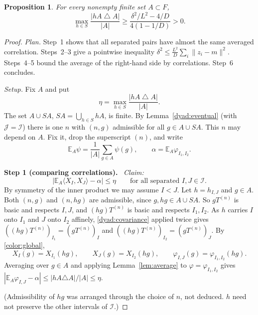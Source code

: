 \documentclass[11pt]{article}
\newcommand{\norm}[1]{\lVert #1\rVert}
\newcommand{\ip}[2]{\langle #1,#2\rangle}
\newcommand{\step}[1]{\par\smallskip\noindent\textbf{Step #1.}\ }
\newtheorem{proposition}[theorem]{Proposition}
\theoremstyle{definition}
\numberwithin{equation}{section}
\begin{document}
\begin{proposition}\label{avg:boundary}
For every nonempty finite set $A\subset F$,
\begin{equation}\label{avg:boundary-bound}
  \max_{h\in S}\frac{|hA\mathbin{\triangle}A|}{|A|}
  \ge\frac{\delta^2/L^2-4/D}{4(1-1/D)}>0.
\end{equation}
\end{proposition}

\begin{proof}
\emph{Plan.} Step~1 shows that all separated pairs have almost the same
averaged correlation. Steps~2--3 give a pointwise inequality
$\delta^2\le\frac{L^2}{D}\sum_i\norm{z_i-m}^2$. Steps~4--5 bound the
average of the right-hand side by correlations. Step~6 concludes.

\emph{Setup.} Fix $A$ and put
\begin{equation}\label{avg:defect}
  \eta=\max_{h\in S}\frac{|hA\mathbin{\triangle}A|}{|A|}.
\end{equation}
The set $A\cup SA$, $SA=\bigcup_{h\in S}hA$, is finite. By
Lemma~\ref{dyad:eventual} (with $\mathcal J=\mathcal I$) there is one $n$
with $(n,g)$ admissible for all $g\in A\cup SA$. This $n$ may depend on $A$.
Fix it, drop the superscript $(n)$, and write
\[
  \mathbb E_A\psi=\frac1{|A|}\sum_{g\in A}\psi(g),\qquad
  \alpha=\mathbb E_A\varphi_{I_1,I_2}.
\]

\step{1 (comparing correlations)} \emph{Claim:}
\begin{equation}\label{avg:correlation}
  \bigl|\mathbb E_A\ip{X_I}{X_J}-\alpha\bigr|\le\eta
  \qquad\text{for all separated $I,J\in\mathcal I$}.
\end{equation}
By symmetry of the inner product we may assume $I<J$. Let $h=h_{I,J}$ and
$g\in A$. Both $(n,g)$ and $(n,hg)$ are admissible, since
$g,hg\in A\cup SA$. So $gT^{(n)}$ is basic and respects $I,J$, and
$(hg)T^{(n)}$ is basic and respects $I_1,I_2$. As $h$ carries $I$ onto $I_1$
and $J$ onto $I_2$ affinely, \eqref{dyad:covariance} applied twice gives
$((hg)T^{(n)})_{I_1}=(gT^{(n)})_I$ and $((hg)T^{(n)})_{I_2}=(gT^{(n)})_J$.
By \eqref{color:global},
\[
  X_I(g)=X_{I_1}(hg),\qquad X_J(g)=X_{I_2}(hg),\qquad
  \varphi_{I,J}(g)=\varphi_{I_1,I_2}(hg).
\]
Averaging over $g\in A$ and applying Lemma~\ref{lem:average} to
$\varphi=\varphi_{I_1,I_2}$ gives
$|\mathbb E_A\varphi_{I,J}-\alpha|\le|hA\triangle A|/|A|\le\eta$.

(Admissibility of $hg$ was arranged through the choice of $n$, not deduced.
$h$ need not preserve the other intervals of $\mathcal I$.)


\end{proof}
\end{document}
